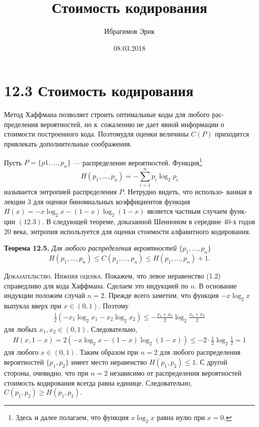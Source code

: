 \documentclass[12pt]{article}
\numberwithin{equation}{section}
\begin{document}
\author{Ибрагимов Эрик}
\date{08.03.2018}
\title{Стоимость кодирования}
\maketitle
\newpage
\tableofcontents
\newpage
\section{12.3 Стоимость кодирования}
Метод Хаффмана позволяет строить оптимальные коды для любого рас-
пределения вероятностей, но к~сожалению не дает явной информации о
стоимости построенного кода. Поэтомудля оценки величины $C(P)$ приходится привлекать дополнительные соображения.

Пусть $P=\{p1,\dots,p_n\}$ — распределение вероятностей. Функция\footnote{Здесь и далее полагаем, что функция $x \log_2 x$ равна нулю при $x = 0$.}
\begin{equation}
H(p_1,\dots,p_n)=-\sum_{i=1}^{n}
p_i\log_{2}p_i
\end{equation}
называется энтропией распределения $P$. Нетрудно видеть, что использо-
ванная в лекции 3 для оценки биномиальных коэффициентов функция
$H(x) =-x\log_2x-(1-x)\log_2(1-x) $ является частным случаем функ-
ции $(12.3)$. В следующей теореме, доказанной Шенноном в середине 40-х
годов 20 века, энтропия используется для оценки стоимости алфавитного
кодирования.

\textbf{Теорема 12.5.} \textit{Для любого распределения вероятностей}
$\{p_1,\dots,p_n\}$
\begin{equation}
H(p_1,\dots,p_n)\le C(p_1,\dots,p_n)\le H(p_1,\dots,p_n)+1.
\end{equation}

\textsc{Доказательство. Нижняя оценка.} Покажем, что левое неравенство
(1.2) справедливо для кода Хаффмана. Сделаем это индукцией по
$n$. В основание индукции положим случай $n = 2$. Прежде всего заметим, что функция
$-x \log_2 x$ выпукла вверх при $x\in(0,1)$. Поэтому
\begin{align*}
\frac{1}{2}(-x_1\log_2x_1-x_2\log_2x_2)\le -\frac{x_1+x_2}{2}\log_2
\frac{x_1+x_2}{2}
\end{align*}
для любых $x_1, x_2 \in(0, 1)$. Следовательно,\\
\begin{align*}
H(x,1-x)=2(-x\log_2x-(1-x)\log_2(1-x))\le
-2\cdot\frac{1}{2}\log_2\frac{1}{2}=1
\end{align*}
для любого $x\in(0, 1)$. Таким образом при $n = 2$ для любого распределения вероятностей $\{p_1, p_2\}$ имеет место неравенство $H(p_1, p_2)\le 1.$ С другой стороны, очевидно, что при $n = 2$ независимо от распределения вероятностей стоимость кодирования всегда равна единице. Следовательно,
$C(p_1, p_2) \ge H(p_1, p_2).$
\end{document}
